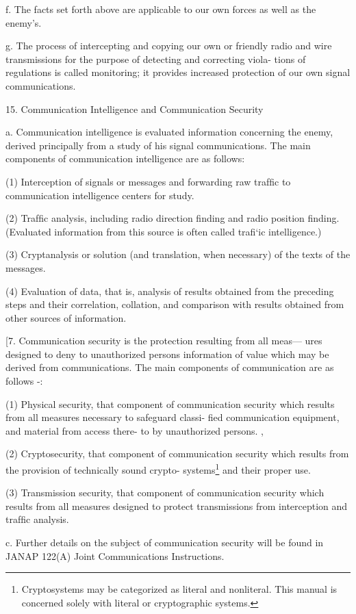 f. The facts set forth above are applicable to our own forces as well
as the enemy’s.

g. The process of intercepting and copying our own or friendly radio
and wire transmissions for the purpose of detecting and correcting viola-
tions of regulations is called monitoring; it provides increased protection
of our own signal communications.

15. Communication Intelligence and Communication Security

a. Communication intelligence is evaluated information concerning the
enemy, derived principally from a study of his signal communications.
The main components of communication intelligence are as follows:

(1) Interception of signals or messages and forwarding raw trafﬁc
to communication intelligence centers for study.

(2) Trafﬁc analysis, including radio direction ﬁnding and radio
position ﬁnding. (Evaluated information from this source is
often called traﬁ‘ic intelligence.)

(3) Cryptanalysis or solution (and translation, when necessary) of
the texts of the messages.

(4) Evaluation of data, that is, analysis of results obtained from the
preceding steps and their correlation, collation, and comparison
with results obtained from other sources of information.

[7. Communication security is the protection resulting from all meas—
ures designed to deny to unauthorized persons information of value
which may be derived from communications. The main components of
communication are as follows -:

(1) Physical security, that component of communication security
which results from all measures necessary to safeguard classi-
ﬁed communication equipment, and material from access there-
to by unauthorized persons. ,

(2) Cryptosecurity, that component of communication security
which results from the provision of technically sound crypto-
systems\footnote{ Cryptosystems may be categorized as literal and nonliteral. This manual is concerned solely with literal or cryptographic systems.  } and their proper use.

(3) Transmission security, that component of communication
security which results from all measures designed to protect
transmissions from interception and trafﬁc analysis.

c. Further details on the subject of communication security will be
found in JANAP 122(A) Joint Communications Instructions.

